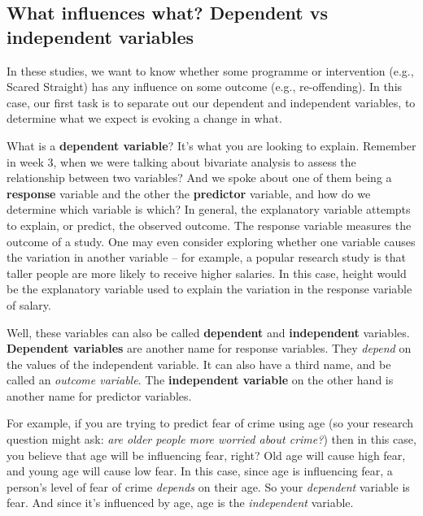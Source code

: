 \documentclass[
]{book}
\begin{document}
\hypertarget{what-influences-what-dependent-vs-independent-variables}{%
\subsection{What influences what? Dependent vs independent variables}\label{what-influences-what-dependent-vs-independent-variables}}

In these studies, we want to know whether some programme or intervention (e.g., Scared Straight) has any influence on some outcome (e.g., re-offending). In this case, our first task is to separate out our dependent and independent variables, to determine what we expect is evoking a change in what.

What is a \textbf{dependent variable}? It's what you are looking to explain. Remember in week 3, when we were talking about bivariate analysis to assess the relationship between two variables? And we spoke about one of them being a \textbf{response} variable and the other the \textbf{predictor} variable, and how do we determine which variable is which? In general, the explanatory variable attempts to explain, or predict, the observed outcome. The response variable measures the outcome of a study. One may even consider exploring whether one variable causes the variation in another variable -- for example, a popular research study is that taller people are more likely to receive higher salaries. In this case, height would be the explanatory variable used to explain the variation in the response variable of salary.

Well, these variables can also be called \textbf{dependent} and \textbf{independent} variables. \textbf{Dependent variables} are another name for response variables. They \emph{depend} on the values of the independent variable. It can also have a third name, and be called an \emph{outcome variable}. The \textbf{independent variable} on the other hand is another name for predictor variables.

For example, if you are trying to predict fear of crime using age (so your research question might ask: \emph{are older people more worried about crime?}) then in this case, you believe that age will be influencing fear, right? Old age will cause high fear, and young age will cause low fear. In this case, since age is influencing fear, a person's level of fear of crime \emph{depends} on their age. So your \emph{dependent} variable is fear. And since it's influenced by age, age is the \emph{independent} variable.
\end{document}
